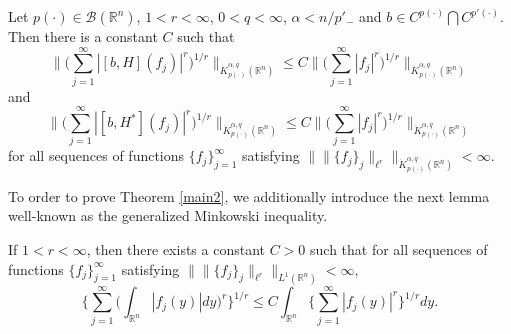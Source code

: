 \documentclass{amse-new}
\numberwithin{equation}{section} %
\begin{document}
\begin{theorem}\label{main2}
Let $p(\cdot)\in \mathcal{B}(\mathbb{R}^n)$, $1<r<\infty$, $0<q<\infty$, $\alpha<n/p'_{-}$ and $b\in C^{p(\cdot)}\bigcap C^{p'(\cdot)}$. Then there is a constant $C$ such that
\begin{equation*}
\bigg\|\Big(\sum_{j=1}^{\infty}|[b,H](f_{j})|^{r}\Big)^{1/r}\bigg\|_{\dot{K}^{\alpha,q}_{p(\cdot)}(\mathbb{R}^n)}\leq C\bigg\|\Big(\sum_{j=1}^{\infty}|f_{j}|^{r}\Big)^{1/r}\bigg\|_{\dot{K}^{\alpha,q}_{p(\cdot)}(\mathbb{R}^n)}
\end{equation*}
and
\begin{equation*}
\bigg\|\Big(\sum_{j=1}^{\infty}|[b,H^*](f_{j})|^{r}\Big)^{1/r}\bigg\|_{\dot{K}^{\alpha,q}_{p(\cdot)}(\mathbb{R}^n)}\leq C\bigg\|\Big(\sum_{j=1}^{\infty}|f_{j}|^{r}\Big)^{1/r}\bigg\|_{\dot{K}^{\alpha,q}_{p(\cdot)}(\mathbb{R}^n)}
\end{equation*}
for all sequences of functions $\{f_{j}\}_{j=1}^{\infty}$ satisfying $\|\|\{f_{j}\}_{j}\|_{\ell^{r}}\|_{\dot{K}^{\alpha,q}_{p(\cdot)}(\mathbb{R}^n)}<\infty$.
\end{theorem}

To order to prove Theorem \ref{main2}, we additionally introduce the next lemma well-known as the generalized Minkowski inequality.
\begin{lemma}\label{l7}
If $1<r<\infty$, then there exists a constant $C>0$ such that for all sequences of functions $\{f_{j}\}_{j=1}^{\infty}$ satisfying $\|\|\{f_{j}\}_{j}\|_{\ell^{r}}\|_{L^{1}(\mathbb{R}^n)}<\infty$,
\begin{equation}\label{5.1}
\bigg\{\sum_{j=1}^{\infty}\bigg(\int_{\mathbb{R}^n}|f_{j}(y)|dy\bigg)^{r}\bigg\}^{1/r}\leq C\int_{\mathbb{R}^n}\bigg\{\sum_{j=1}^{\infty}|f_{j}(y)|^{r}\bigg\}^{1/r}dy.
\end{equation}
\end{lemma}
\end{document}
